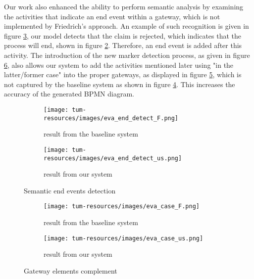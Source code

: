 Our work also enhanced the ability to perform semantic analysis by examining the activities that indicate an end event within a gateway, which is not implemented by Friedrich's approach. An example of such recognition is given in figure \ref{img:end_event_rec}, our model detects that the claim is rejected, which indicates that the process will end, shown in figure \ref{img:end_event_rec:right}. Therefore, an end event is added after this activity. The introduction of the new marker detection process, as given in figure \ref{img:case}, also allows our system to add the activities mentioned later using "in the latter/former case" into the proper gateways, as displayed in figure \ref{img:case:right}, which is not captured by the baseline system as shown in figure \ref{img:case:left}. This increases the accuracy of the generated BPMN diagram. 

\begin{figure}
     \centering
     \begin{subfigure}[b]{0.4\textwidth}
         \centering
         \texttt{[image: tum-resources/images/eva\_end\_detect\_F.png]}
         \caption{result from the baseline system}
         \label{img:end_event_rec:left}
     \end{subfigure}
     \hfill
     \begin{subfigure}[b]{0.5\textwidth}
         \centering
         \texttt{[image: tum-resources/images/eva\_end\_detect\_us.png]}
         \caption{result from our system}
         \label{img:end_event_rec:right}
     \end{subfigure}
     \hfill
     \caption{Semantic end events detection}
     \label{img:end_event_rec}
\end{figure}

\begin{figure}
     \centering
     \begin{subfigure}[b]{0.4\textwidth}
         \centering
         \texttt{[image: tum-resources/images/eva\_case\_F.png]}
         \caption{result from the baseline system}
         \label{img:case:left}
     \end{subfigure}
     \hfill
     \begin{subfigure}[b]{0.5\textwidth}
         \centering
         \texttt{[image: tum-resources/images/eva\_case\_us.png]}
         \caption{result from our system}
         \label{img:case:right}
     \end{subfigure}
     \hfill
     \caption{Gateway elements complement}
     \label{img:case}
\end{figure}

